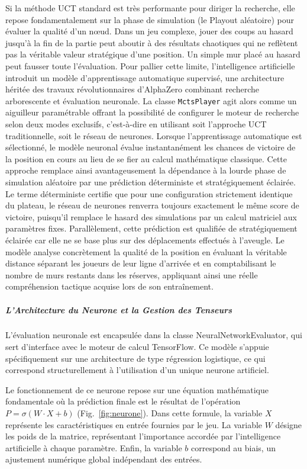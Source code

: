 \documentclass[a4paper]{article}
\begin{document}
Si la méthode UCT standard est très performante pour diriger la recherche, elle repose fondamentalement sur la phase de simulation (le Playout aléatoire) pour évaluer la qualité d'un nœud. Dans un jeu complexe, jouer des coups au hasard jusqu'à la fin de la partie peut aboutir à des résultats chaotiques qui ne reflètent pas la véritable valeur stratégique d'une position. Un simple mur placé au hasard peut fausser toute l'évaluation. Pour pallier cette limite, l'intelligence artificielle introduit un modèle d'apprentissage automatique supervisé, une architecture héritée des travaux révolutionnaires d'AlphaZero combinant recherche arborescente et évaluation neuronale\cite{silver2017masteringchessshogiselfplay}. La classe \texttt{MctsPlayer} agit alors comme un aiguilleur paramétrable offrant la possibilité de configurer le moteur de recherche selon deux modes exclusifs, c'est-à-dire en utilisant soit l'approche UCT traditionnelle, soit le réseau de neurones. Lorsque l'apprentissage automatique est sélectionné, le modèle neuronal évalue instantanément les chances de victoire de la position en cours au lieu de se fier au calcul mathématique classique. Cette approche remplace ainsi avantageusement la dépendance à la lourde phase de simulation aléatoire par une prédiction déterministe et stratégiquement éclairée. Le terme déterministe certifie que pour une configuration strictement identique du plateau, le réseau de neurones renverra toujours exactement le même score de victoire, puisqu'il remplace le hasard des simulations par un calcul matriciel aux paramètres fixes. Parallèlement, cette prédiction est qualifiée de stratégiquement éclairée car elle ne se base plus sur des déplacements effectués à l'aveugle. Le modèle analyse concrètement la qualité de la position en évaluant la véritable distance séparant les joueurs de leur ligne d'arrivée et en comptabilisant le nombre de murs restants dans les réserves, appliquant ainsi une réelle compréhension tactique acquise lors de son entraînement.

\subparagraph{L'Architecture du Neurone et la Gestion des Tenseurs}

L'évaluation neuronale est encapsulée dans la classe NeuralNetworkEvaluator, qui sert d'interface avec le moteur de calcul TensorFlow. Ce modèle s'appuie spécifiquement sur une architecture de type régression logistique, ce qui correspond structurellement à l'utilisation d'un unique neurone artificiel.

Le fonctionnement de ce neurone repose sur une équation mathématique fondamentale où la prédiction finale est le résultat de l'opération $P = \sigma(W \cdot X + b)$ (Fig.~\ref{fig:neurone}). Dans cette formule, la variable $X$ représente les caractéristiques en entrée fournies par le jeu. La variable $W$ désigne les poids de la matrice, représentant l'importance accordée par l'intelligence artificielle à chaque paramètre. Enfin, la variable $b$ correspond au biais, un ajustement numérique global indépendant des entrées.
\end{document}
